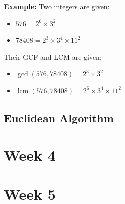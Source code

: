 \documentclass[12pt]{article}
\theoremstyle{definition}
\DeclareMathOperator{\lcm}{lcm}
\begin{document}
    \textbf{Example:} Two integers are given:
    \begin{itemize} 
        \item $576 = 2^6 \times 3^2$
        \item $78408 = 2^3 \times 3^4 \times 11^2$
    \end{itemize}
    Their GCF and LCM are given:
    \begin{itemize}
        \item $\gcd(576,78408) = 2^3 \times 3^2$
        \item $\lcm(576, 78408) = 2^6 \times 3^4 \times 11^2$
    \end{itemize}


    \subsection{Euclidean Algorithm}


    \newpage
    \section{Week 4}

    \newpage
    \section{Week 5}
    
\end{document}
